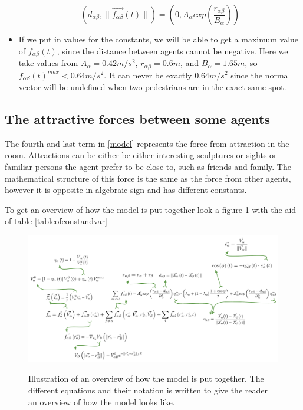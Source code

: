 \begin{itemize}
\begin{equation}
	\left( d_{\alpha \beta} , \| \vec{f_{\alpha \beta}} \left( t \right) \| \right)
 =
	\left( 0 , A_{\alpha} exp\left( \frac{r_{\alpha\beta} }{B_{\alpha}}\right)  \right) 
\end{equation}

\item If we put in values for the constants, we will be able to get a maximum value of $ f_{\alpha\beta}(t) $, 
since the distance between agents cannot be negative. Here we take values from \cite{ABconstant} $ A_{\alpha} = 0.42 m/s^{2} $, 
$ r_{\alpha\beta} = 0.6 m $, and $ B_{\alpha} = 1.65 m $, so 
$ f_{\alpha\beta}(t)^{max} < 0.64 m/s^{2} $. It can never be exactly $0.64m/s^2$ since the normal vector will be undefined when two pedestrians are in the exact same spot.

\end{itemize}



\subsection{The attractive forces between some agents}
The fourth and last term in \eqref{model} represents the force from attraction 
in the room. Attractions can be either be either interesting sculptures or 
sights or familiar persons the agent prefer to be close to, such as friends 
and family. The mathematical structure of this force is the same as the force 
from other agents, however it is opposite in algebraic sign and has different 
constants. 

To get an overview of how the model is put together look a figure \ref{overview}
with the aid of table \ref{tableofconstandvar}

\begin{figure}[hb] %
    \centering
    {\includegraphics[scale=0.45]{Figures/overview.pdf}} 
    \caption[Overview of the model]{Illustration of an overview of how the model is put together. The different equations and their notation is written to give the 
	     reader an overview of how the model looks like.}
    \label{overview}
\end{figure}